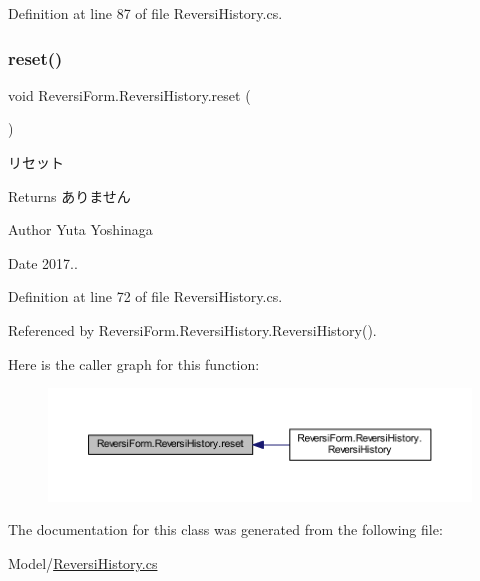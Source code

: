 Definition at line 87 of file Reversi\+History.\+cs.

\mbox{\label{class_reversi_form_1_1_reversi_history_aa86ef20775db0009ddfbed5f813fe2d8}} 
\subsubsection{\texorpdfstring{reset()}{reset()}}
{\footnotesize\ttfamily void Reversi\+Form.\+Reversi\+History.\+reset (\begin{DoxyParamCaption}{ }\end{DoxyParamCaption})}



リセット 

\begin{DoxyReturn}{Returns}
ありません 
\end{DoxyReturn}
\begin{DoxyAuthor}{Author}
Yuta Yoshinaga 
\end{DoxyAuthor}
\begin{DoxyDate}{Date}
2017.. 
\end{DoxyDate}


Definition at line 72 of file Reversi\+History.\+cs.



Referenced by Reversi\+Form.\+Reversi\+History.\+Reversi\+History().

Here is the caller graph for this function\+:\nopagebreak
\begin{figure}[H]
\begin{center}
\leavevmode
\includegraphics[width=350pt]{class_reversi_form_1_1_reversi_history_aa86ef20775db0009ddfbed5f813fe2d8_icgraph}
\end{center}
\end{figure}


The documentation for this class was generated from the following file\+:\begin{DoxyCompactItemize}
\item 
Model/\hyperlink{_reversi_history_8cs}{Reversi\+History.\+cs}\end{DoxyCompactItemize}
